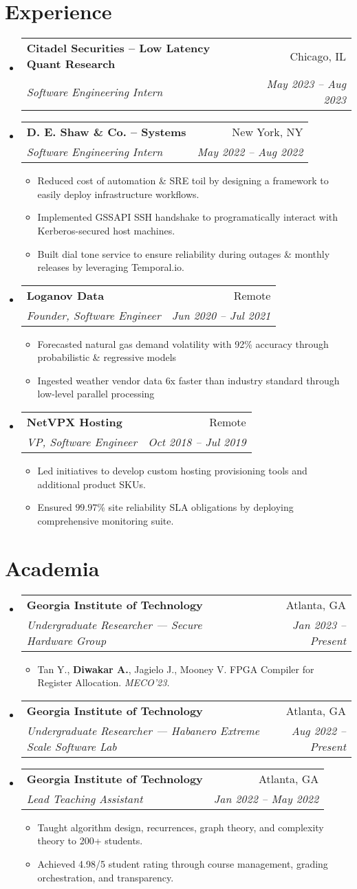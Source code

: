 \documentclass[a4paper,11pt]{extarticle}
\makeatletter
\newcommand{\resumeItem}[1]{
	\item\small{
		#1 \vspace{-1.2pt}
	}
}
\newcommand{\resumeSubheading}[4]{
	\vspace{-1pt}
    \item
		\begin{tabular*}{1\linewidth}{l@{\extracolsep{\fill}}r}
			\textbf{#1} & #2 \\
			\textit{#3} & \textit{#4} \\
		\end{tabular*}\vspace{-2pt}
}
\newcommand{\resumeSubHeadingListStart}{
    \begin{itemize}[leftmargin=0.15in,label={}]}
\newcommand{\resumeSubHeadingListEnd}{\end{itemize}}
\newcommand{\resumeItemListStart}{\begin{itemize}\vspace{-3pt}}
\newcommand{\resumeItemListEnd}{\end{itemize}\vspace{-3pt}}
\makeatother
\begin{document}
\section{Experience}
	\resumeSubHeadingListStart
        \resumeSubheading
            {Citadel Securities -- Low Latency Quant Research}
            {Chicago, IL}
            {Software Engineering Intern}
            {May 2023 -- Aug 2023}
        \resumeSubheading
            {D. E. Shaw \& Co. -- Systems}
            {New York, NY}
            {Software Engineering Intern}
            {May 2022 -- Aug 2022}
		\resumeItemListStart
            \resumeItem{Reduced cost of automation \& SRE toil by
                designing a framework to easily deploy infrastructure
                workflows.}
            \resumeItem{Implemented GSSAPI SSH handshake to programatically
                interact with Kerberos-secured host machines.}
            \resumeItem{Built dial tone service to ensure reliability during
                outages \& monthly releases by leveraging Temporal.io.}
		\resumeItemListEnd
		\resumeSubheading
            {Loganov Data}
            {Remote}
		    {Founder, Software Engineer}
            {Jun 2020 -- Jul 2021}
		\resumeItemListStart
			\resumeItem{Forecasted natural gas demand volatility with 92\%
                accuracy through probabilistic \& regressive models}
			\resumeItem{Ingested weather vendor data 6x faster than industry
				standard through low-level parallel processing}
		\resumeItemListEnd
		\resumeSubheading
            {NetVPX Hosting}
            {Remote}
		    {VP, Software Engineer}
            {Oct 2018 -- Jul 2019}
		\resumeItemListStart
			\resumeItem{Led initiatives to develop custom hosting provisioning
				tools and additional product SKUs.}
			\resumeItem{Ensured $99.97$\% site reliability SLA obligations
                by deploying comprehensive monitoring suite.}
		\resumeItemListEnd
	\resumeSubHeadingListEnd

\section{Academia}
	\resumeSubHeadingListStart
        \resumeSubheading
            {Georgia Institute of Technology}
            {Atlanta, GA}
            {Undergraduate Researcher --- Secure Hardware Group}
            {Jan 2023 -- Present}
		\resumeItemListStart
            \resumeItem{Tan Y., \textbf{Diwakar A.}, Jagielo J., Mooney V.
                FPGA Compiler for Register Allocation. \textit{MECO'23.}}
		\resumeItemListEnd
        \resumeSubheading
            {Georgia Institute of Technology}
            {Atlanta, GA}
            {Undergraduate Researcher --- Habanero Extreme Scale Software Lab}
            {Aug 2022 -- Present}
        \resumeSubheading
            {Georgia Institute of Technology}
            {Atlanta, GA}
            {Lead Teaching Assistant}
            {Jan 2022 -- May 2022}
		\resumeItemListStart
			\resumeItem{Taught algorithm design, recurrences, graph
            theory, and complexity theory to 200+ students.}
            \resumeItem{Achieved 4.98/5 student rating through course management,
                grading orchestration, and transparency.}
		\resumeItemListEnd
	\resumeSubHeadingListEnd
\end{document}
